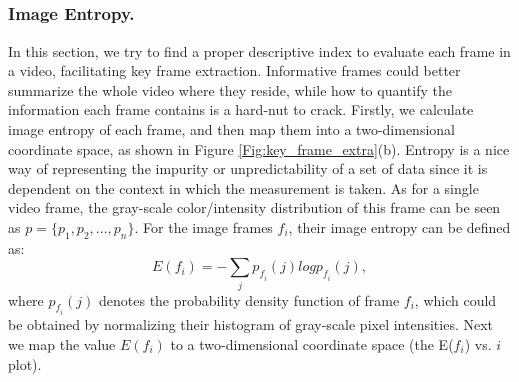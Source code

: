 \documentclass[5p]{elsarticle}
\begin{document}
\begin{figure*}[!htbp]
	\begin{centering}
		\centering
		\setcounter{subfigure}{0}
		 \\
		 \\
		 \\
		 \\
		\caption{The framework of the proposed key frames extraction method.}
		\label{Fig:key_frame_extra}
	\end{centering}
\end{figure*}

\subsubsection{Image Entropy.}
In this section, we try to find a proper descriptive index to evaluate each frame in a video, facilitating key frame extraction.
Informative frames could better summarize the whole video where they reside, while how to quantify the information each frame contains is a hard-nut to crack.
Firstly, we calculate image entropy of each frame, and then map them into a two-dimensional coordinate space, as shown in  Figure \ref{Fig:key_frame_extra}(b).
Entropy is a nice way of representing the impurity or unpredictability of a set of data since it is dependent on the context in which the measurement is taken.
As for a single video frame, the gray-scale color/intensity distribution of this frame can be seen as $p = \{p_1, p_2, ... , p_n\}$.
For the image frames $f_i$, their image entropy can be defined as:
\begin{equation}
\label{Equ:entropy}
E(f_i) = -\sum _{j} p_\mathit{f_i}(j)logp_\mathit{f_i}(j),
\end{equation}
where $p_\mathit{f_i}(j)$ denotes the probability density function of frame $f_i$, which could be obtained by normalizing their histogram of gray-scale pixel intensities.
Next we map the value $E(f_i)$ to a two-dimensional coordinate space (the E($f_i$) vs. $i$ plot).
\end{document}
